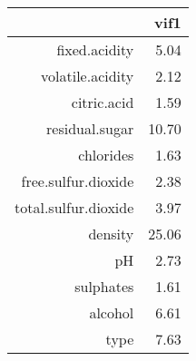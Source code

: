 \begin{tabular}{rr}
  \hline
 & vif1 \\ 
  \hline
fixed.acidity & 5.04 \\ 
  volatile.acidity & 2.12 \\ 
  citric.acid & 1.59 \\ 
  residual.sugar & 10.70 \\ 
  chlorides & 1.63 \\ 
  free.sulfur.dioxide & 2.38 \\ 
  total.sulfur.dioxide & 3.97 \\ 
  density & 25.06 \\ 
  pH & 2.73 \\ 
  sulphates & 1.61 \\ 
  alcohol & 6.61 \\ 
  type & 7.63 \\ 
   \hline
\end{tabular}
